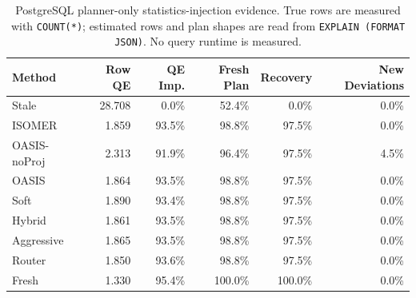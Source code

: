 \begin{table}[t]
  \centering
  \small
  \caption{PostgreSQL planner-only statistics-injection evidence. True rows are measured with \texttt{COUNT(*)}; estimated rows and plan shapes are read from \texttt{EXPLAIN (FORMAT JSON)}. No query runtime is measured.}
  \label{tab:postgres_planner_stats_injection}
  \setlength{\tabcolsep}{4pt}
  \begin{tabular}{lrrrrr}
    \toprule
    Method & Row QE & QE Imp. & Fresh Plan & Recovery & New Deviations \\
    \midrule
    Stale & 28.708 & 0.0\% & 52.4\% & 0.0\% & 0.0\% \\
    ISOMER & 1.859 & 93.5\% & 98.8\% & 97.5\% & 0.0\% \\
    OASIS-noProj & 2.313 & 91.9\% & 96.4\% & 97.5\% & 4.5\% \\
    OASIS & 1.864 & 93.5\% & 98.8\% & 97.5\% & 0.0\% \\
    Soft & 1.890 & 93.4\% & 98.8\% & 97.5\% & 0.0\% \\
    Hybrid & 1.861 & 93.5\% & 98.8\% & 97.5\% & 0.0\% \\
    Aggressive & 1.865 & 93.5\% & 98.8\% & 97.5\% & 0.0\% \\
    Router & 1.850 & 93.6\% & 98.8\% & 97.5\% & 0.0\% \\
    Fresh & 1.330 & 95.4\% & 100.0\% & 100.0\% & 0.0\% \\
    \bottomrule
  \end{tabular}
\end{table}

